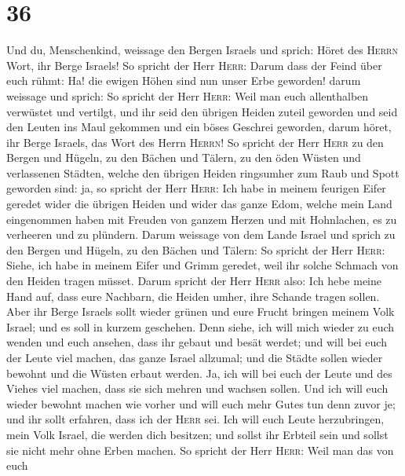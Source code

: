 \hypertarget{section-35}{%
\section{36}\label{section-35}}

 Und du, Menschenkind, weissage den Bergen Israels und
sprich: Höret des \textsc{Herrn} Wort, ihr Berge Israels! 
So spricht der Herr \textsc{Herr}: Darum dass der Feind über euch rühmt:
Ha! die ewigen Höhen sind nun unser Erbe geworden!  darum
weissage und sprich: So spricht der Herr \textsc{Herr}: Weil man euch
allenthalben verwüstet und vertilgt, und ihr seid den übrigen Heiden
zuteil geworden und seid den Leuten ins Maul gekommen und ein böses
Geschrei geworden,  darum höret, ihr Berge Israels, das
Wort des Herrn \textsc{Herrn}! So spricht der Herr \textsc{Herr} zu den
Bergen und Hügeln, zu den Bächen und Tälern, zu den öden Wüsten und
verlassenen Städten, welche den übrigen Heiden ringsumher zum Raub und
Spott geworden sind:  ja, so spricht der Herr
\textsc{Herr}: Ich habe in meinem feurigen Eifer geredet wider die
übrigen Heiden und wider das ganze Edom, welche mein Land eingenommen
haben mit Freuden von ganzem Herzen und mit Hohnlachen, es zu verheeren
und zu plündern.  Darum weissage von dem Lande Israel und
sprich zu den Bergen und Hügeln, zu den Bächen und Tälern: So spricht
der Herr \textsc{Herr}: Siehe, ich habe in meinem Eifer und Grimm
geredet, weil ihr solche Schmach von den Heiden tragen müsset.
 Darum spricht der Herr \textsc{Herr} also: Ich hebe meine
Hand auf, dass eure Nachbarn, die Heiden umher, ihre Schande tragen
sollen.  Aber ihr Berge Israels sollt wieder grünen und
eure Frucht bringen meinem Volk Israel; und es soll in kurzem geschehen.
 Denn siehe, ich will mich wieder zu euch wenden und euch
ansehen, dass ihr gebaut und besät werdet;  und will bei
euch der Leute viel machen, das ganze Israel allzumal; und die Städte
sollen wieder bewohnt und die Wüsten erbaut werden.  Ja,
ich will bei euch der Leute und des Viehes viel machen, dass sie sich
mehren und wachsen sollen. Und ich will euch wieder bewohnt machen wie
vorher und will euch mehr Gutes tun denn zuvor je; und ihr sollt
erfahren, dass ich der \textsc{Herr} sei.  Ich will euch
Leute herzubringen, mein Volk Israel, die werden dich besitzen; und
sollst ihr Erbteil sein und sollst sie nicht mehr ohne Erben machen.
 So spricht der Herr \textsc{Herr}: Weil man das von euch
